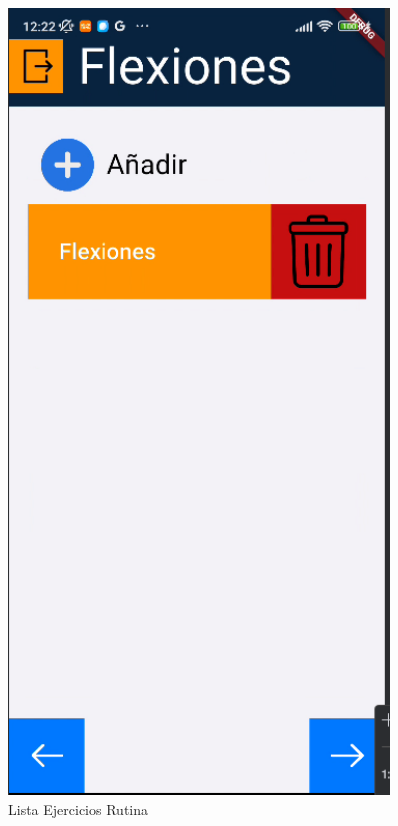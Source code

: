 \begin{figure}[H]
   \centering
   \begin{minipage}{0.35\textwidth}
      \centering
      \includegraphics[width=0.9\textwidth]{pantallas/listaEjerRutina.png}
      \caption{Lista Ejercicios Rutina}
      \label{fig:listaEjerRutina}
   \end{minipage}%
   \hspace{0.5cm}

\end{figure}
